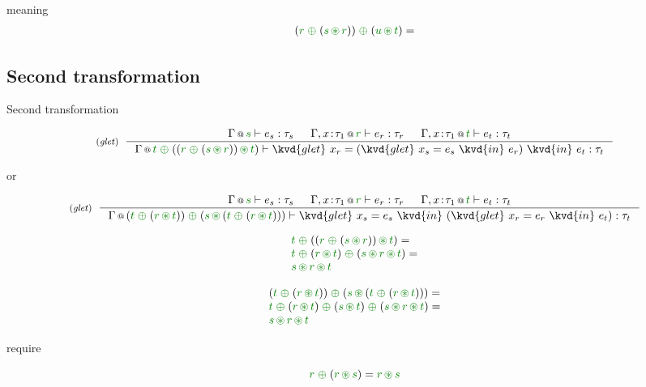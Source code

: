 meaning
\begin{equation*}
\begin{array}{l}
(\cclrd{r}\;\cpar\;(\cclrd{s}\,\cseq\,\cclrd{r})) \;\cpar\; (\cclrd{u}\,\cseq\,\cclrd{t}) =
\end{array}
\end{equation*}

\subsection{Second transformation}


Second transformation

\begin{equation*}
\tyrule{glet}
  { \coctx{\Gamma}{\cclrd{s}} \vdash e_s : \tau_s &
    \coctx{\Gamma, x\!:\!\tau_1}{\cclrd{r}} \vdash e_r : \tau_r &
    \coctx{\Gamma, x\!:\!\tau_1}{\cclrd{t}} \vdash e_t : \tau_t }
  { \coctx{\Gamma}{
      \cclrd{t}
      \;\cpar\;
      (  (\cclrd{r}\;\cpar\;(\cclrd{s}\,\cseq\,\cclrd{r}))
         \,\cseq\, 
         \cclrd{t} )
    } 
    \vdash \kvd{glet}~x_r=(\kvd{glet}~x_s=e_s~\kvd{in}~e_r)~\kvd{in}~e_t : \tau_t }
\end{equation*}

or

\begin{equation*}
\tyrule{glet}
  { \coctx{\Gamma}{\cclrd{s}} \vdash e_s : \tau_s &
    \coctx{\Gamma, x\!:\!\tau_1}{\cclrd{r}} \vdash e_r : \tau_r &
    \coctx{\Gamma, x\!:\!\tau_1}{\cclrd{t}} \vdash e_t : \tau_t }
  { \coctx{\Gamma}{
      (\cclrd{t}\;\cpar\;(\cclrd{r}\,\cseq\,\cclrd{t})) 
      \;\cpar\;
      (  \cclrd{s}
         \,\cseq\, 
         (\cclrd{t}\;\cpar\;(\cclrd{r}\,\cseq\,\cclrd{t})) )
    } 
    \vdash \kvd{glet}~x_s=e_s~\kvd{in}~(\kvd{glet}~x_r=e_r~\kvd{in}~e_t) : \tau_t }
\end{equation*}


\begin{equation*}
\begin{array}{l}
  \cclrd{t}
  \;\cpar\;
  (  (\cclrd{r}\;\cpar\;(\cclrd{s}\,\cseq\,\cclrd{r}))
     \,\cseq\, 
     \cclrd{t} ) = 
\\
  \cclrd{t}
  \;\cpar\;
  (\cclrd{r}\,\cseq\, \cclrd{t})
  \;\cpar\;
  (\cclrd{s}\,\cseq\,\cclrd{r}\,\cseq\, \cclrd{t}) = 
\\
  \cclrd{s}\,\cseq\,\cclrd{r}\,\cseq\, \cclrd{t} 
\end{array}
\end{equation*}

\begin{equation*}
\begin{array}{l}
  (\cclrd{t}\;\cpar\;(\cclrd{r}\,\cseq\,\cclrd{t})) 
  \;\cpar\;
  (  \cclrd{s}
     \,\cseq\, 
     (\cclrd{t}\;\cpar\;(\cclrd{r}\,\cseq\,\cclrd{t})) ) = 
\\     
  \cclrd{t}\;\cpar\;(\cclrd{r}\,\cseq\,\cclrd{t})
  \;\cpar\;
  (\cclrd{s} \,\cseq\, \cclrd{t})
  \;\cpar\;
  (\cclrd{s} \,\cseq\, \cclrd{r}\,\cseq\,\cclrd{t})  = 
\\     
  \cclrd{s} \,\cseq\, \cclrd{r}\,\cseq\,\cclrd{t}
\end{array}
\end{equation*}

require

\begin{equation*}
\cclrd{r}\;\cpar\;(\cclrd{r} \,\cseq\, \cclrd{s}) = \cclrd{r} \,\cseq\, \cclrd{s}
\end{equation*}
